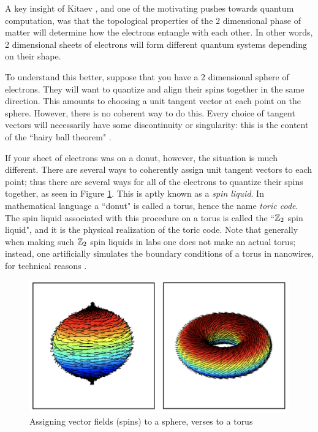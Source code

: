 \documentclass{article}
\theoremstyle{definition}
\numberwithin{figure}{section}
\begin{document}
A key insight of Kitaev \cite{kitaev2003fault}, and one of the motivating pushes towards quantum computation, was that the topological properties of the 2 dimensional phase of matter will determine how the electrons entangle with each other. In other words, 2 dimensional sheets of electrons will form different quantum systems depending on their shape.

To understand this better, suppose that you have a 2 dimensional sphere of electrons. They will want to quantize and align their spins together in the same direction. This amounts to choosing a unit tangent vector at each point on the sphere. However, there is no coherent way to do this. Every choice of tangent vectors will necessarily have some discontinuity or singularity: this is the content of the ``hairy ball theorem" \cite{eisenberg1979proof}.

If your sheet of electrons was on a donut, however, the situation is much different. There are several ways to coherently assign unit tangent vectors to each point; thus there are several ways for all of the electrons to quantize their spins together, as seen in Figure \ref{fig:hairy-ball}. This is aptly known as a \textit{spin liquid}. In mathematical language a ``donut" is called a torus, hence the name \textit{toric code}. The spin liquid associated with this procedure on a torus is called the ``$\mathbb{Z}_2$ spin liquid", and it is the physical realization of the toric code. Note that generally when making such $\mathbb{Z}_2$ spin liquids in labs one does not make an actual torus; instead, one artificially simulates the boundary conditions of a torus in nanowires, for technical reasons \cite{albrecht2016exponential, mourik2012signatures}.

\begin{figure}
\begin{center}
\includegraphics[scale=0.2]{Hairy-Ball-Diagram}
\caption{Assigning vector fields (spins) to a sphere, verses to a torus}
\label{fig:hairy-ball}
\end{center}
\end{figure}
\end{document}
